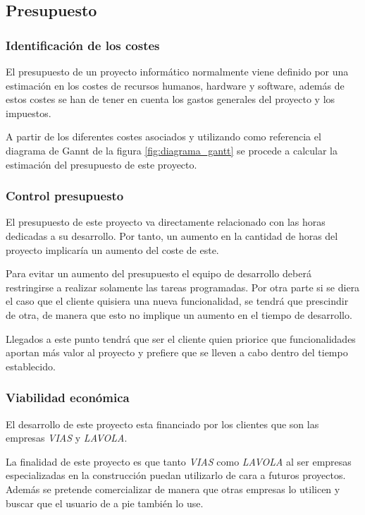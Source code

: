\subsection{Presupuesto}
\subsubsection{Identificación de los costes}
El presupuesto de un proyecto informático normalmente viene definido por una estimación en los costes de recursos humanos, hardware y software, además de estos costes se han de tener en cuenta los gastos generales del proyecto y los impuestos.

A partir de los diferentes costes asociados y utilizando como referencia el diagrama de Gannt de la figura \ref{fig:diagrama_gantt} se procede a calcular la estimación del presupuesto de este proyecto.






\subsubsection{Control presupuesto}
El presupuesto de este proyecto va directamente relacionado con las horas dedicadas a su desarrollo. Por tanto, un aumento en la cantidad de horas del proyecto implicaría un aumento del coste de este.

Para evitar un aumento del presupuesto el equipo de desarrollo deberá restringirse a realizar solamente las tareas programadas. Por otra parte si se diera el caso que el cliente quisiera una nueva funcionalidad, se tendrá que prescindir de otra, de manera que esto no implique un aumento en el tiempo de desarrollo. 

Llegados a este punto tendrá que ser el cliente quien priorice que funcionalidades aportan más valor al proyecto y prefiere que se lleven a cabo dentro del tiempo establecido.
\subsubsection{Viabilidad económica}
El desarrollo de este proyecto esta financiado por los clientes que son las empresas \textit{VIAS} y \textit{LAVOLA}.

La finalidad de este proyecto es que tanto \textit{VIAS} como \textit{LAVOLA} al ser empresas especializadas en la construcción puedan utilizarlo de cara a futuros proyectos. Además se pretende comercializar de manera que otras empresas lo utilicen y buscar que el usuario de a pie también lo use.